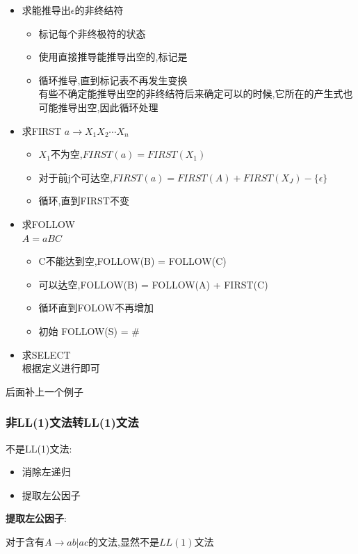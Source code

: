 \documentclass[UTF8,a4paper]{ctexart}
\begin{document}
 \begin{itemize}
  \item 求能推导出$\epsilon$的非终结符
\begin{itemize}
  \item 标记每个非终极符的状态
  \item 使用直接推导能推导出空的,标记是
  \item 循环推导,直到标记表不再发生变换\\
        有些不确定能推导出空的非终结符后来确定可以的时候,它所在的产生式也可能推导出空,因此循环处理
\end{itemize}
  \item 求FIRST
        $a \to X_1 X_2 \cdots X_n$
        \begin{itemize}
         \item $X_1$不为空,$FIRST(a)=FIRST(X_1)$
         \item 对于前j个可达空,$FIRST(a) = FIRST(A) + FIRST(X_J) - \{\epsilon\}$
         \item 循环,直到FIRST不变
        \end{itemize}
  \item 求FOLLOW\\
        $A = aBC$
        \begin{itemize}
         \item C不能达到空,FOLLOW(B) = FOLLOW(C)
         \item 可以达空,FOLLOW(B) = FOLLOW(A) + FIRST(C)
         \item 循环直到FOLOW不再增加
         \item 初始 FOLLOW(S) = {$\#$}
        \end{itemize}
  \item 求SELECT\\
        根据定义进行即可
 \end{itemize}

 {\color{red}后面补上一个例子}

 \subsubsection{非LL(1)文法转LL(1)文法}
 不是LL(1)文法:
 \begin{itemize}
  \item 消除左递归
  \item 提取左公因子
 \end{itemize}

 \textbf{提取左公因子}:

 对于含有$A \to ab | ac$的文法,显然不是$LL(1)$文法
\end{document}
